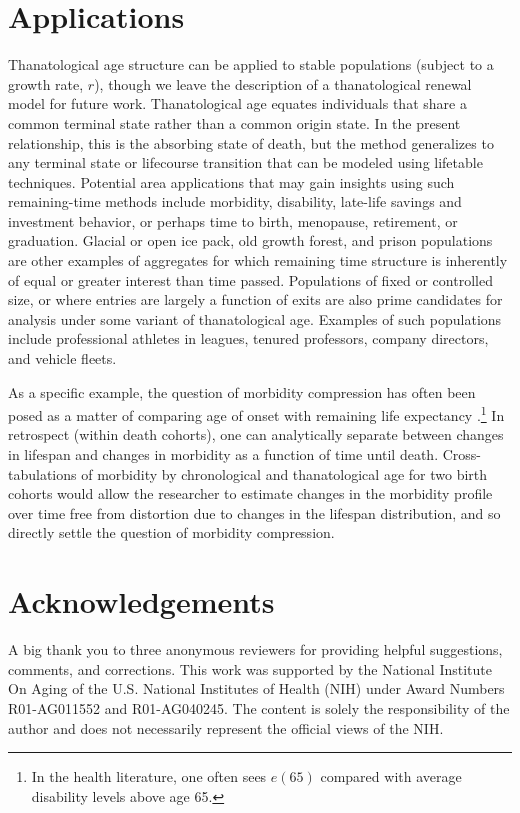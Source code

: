 \documentclass[leqno]{article}
\begin{document}
\section*{Applications}
Thanatological age structure can be applied to stable populations (subject to a
growth rate, $r$), though we leave the description of a thanatological
renewal model for future work. Thanatological age equates individuals that share
a common terminal state rather than a common origin state. In the present
relationship, this is the absorbing state of death, but the method generalizes to any terminal state
or lifecourse transition that can be modeled using lifetable techniques. Potential area
applications that may gain insights using such remaining-time methods
include morbidity, disability, late-life savings and investment behavior, or
perhaps time to birth, menopause, retirement, or graduation. Glacial or open
ice pack, old growth forest, and prison populations are other examples of
aggregates for which remaining time structure is inherently of equal or greater
interest than time passed. Populations of fixed or controlled size, or where
entries are largely a function of exits are also prime candidates for analysis under some
variant of thanatological age. Examples of such populations include professional
athletes in leagues, tenured professors, company directors, and vehicle fleets.

As a specific example, the question of morbidity compression has often been
posed as a matter of comparing age of onset with remaining life expectancy
\citep[e.g., ][]{fries2002aging,fries2003measuring}.\footnote{In the health
literature, one often sees $e(65)$ compared with average disability levels above age 65.} In
retrospect (within death cohorts), one can analytically separate between changes
in lifespan and changes in morbidity as a function of time until death. Cross-tabulations of morbidity by chronological and thanatological age for two birth cohorts would allow the
researcher to estimate changes in the morbidity profile over time free from
distortion due to changes in the lifespan distribution, and so directly settle
the question of morbidity compression.

\section*{Acknowledgements}
A big thank you to three anonymous reviewers for providing helpful 
suggestions, comments, and corrections. This work was supported by the National Institute On
Aging of the U.S. National Institutes of Health (NIH) under Award Numbers
R01-AG011552 and R01-AG040245. The content is solely the responsibility of the
author and does not necessarily represent the official views of the NIH.


\end{document}
